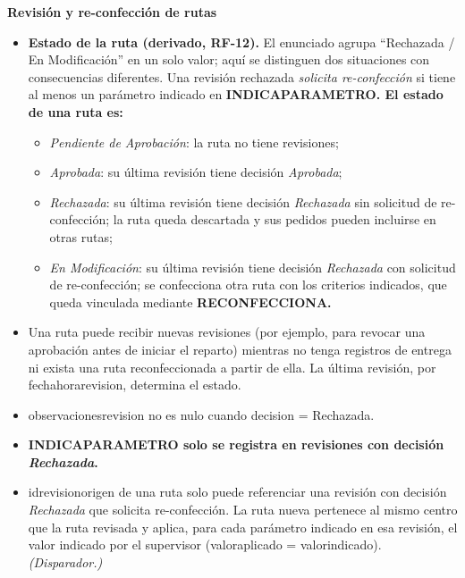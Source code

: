 \documentclass[11pt,a4paper]{article}
\newcommand{\ubrk}{\textunderscore\allowbreak}
\newcommand{\campo}[1]{\textnormal{\ttfamily\let\_\ubrk #1}}
\newcommand{\tabla}[1]{\begingroup\sffamily\bfseries\let\_\ubrk #1\endgroup}
\newcommand{\trig}{\textit{(Disparador.)}}
\begin{document}
\textbf{Revisión y re-confección de rutas}
\begin{itemize}
\item \textbf{Estado de la ruta (derivado, RF-12).} El enunciado agrupa ``Rechazada / En Modificación'' en un solo valor; aquí se distinguen dos situaciones con consecuencias diferentes. Una revisión rechazada \emph{solicita re-confección} si tiene al menos un parámetro indicado en \tabla{INDICA\_PARAMETRO}. El estado de una ruta es:
  \begin{itemize}
  \item \textit{Pendiente de Aprobación}: la ruta no tiene revisiones;
  \item \textit{Aprobada}: su última revisión tiene decisión \textit{Aprobada};
  \item \textit{Rechazada}: su última revisión tiene decisión \textit{Rechazada} sin solicitud de re-confección; la ruta queda descartada y sus pedidos pueden incluirse en otras rutas;
  \item \textit{En Modificación}: su última revisión tiene decisión \textit{Rechazada} con solicitud de re-confección; se confecciona otra ruta con los criterios indicados, que queda vinculada mediante \tabla{RECONFECCIONA}.
  \end{itemize}
\item Una ruta puede recibir nuevas revisiones (por ejemplo, para revocar una aprobación antes de iniciar el reparto) mientras no tenga registros de entrega ni exista una ruta reconfeccionada a partir de ella. La última revisión, por \campo{fecha\_hora\_revision}, determina el estado.
\item \campo{observaciones\_revision} no es nulo cuando \campo{decision} = Rechazada.
\item \tabla{INDICA\_PARAMETRO} solo se registra en revisiones con decisión \textit{Rechazada}.
\item \campo{id\_revision\_origen} de una ruta solo puede referenciar una revisión con decisión \textit{Rechazada} que solicita re-confección. La ruta nueva pertenece al mismo centro que la ruta revisada y aplica, para cada parámetro indicado en esa revisión, el valor indicado por el supervisor (\campo{valor\_aplicado} = \campo{valor\_indicado}). \trig
\end{itemize}
\end{document}
